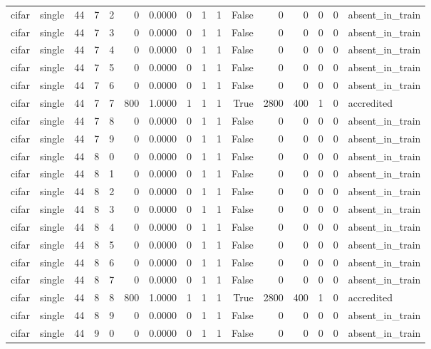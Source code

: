 \begin{tabular}{llrrrrrrrrrrrrrl}
cifar & single & 44 & 7 & 2 & 0 & 0.0000 & 0 & 1 & 1 & False & 0 & 0 & 0 & 0 & absent\_in\_train \\
cifar & single & 44 & 7 & 3 & 0 & 0.0000 & 0 & 1 & 1 & False & 0 & 0 & 0 & 0 & absent\_in\_train \\
cifar & single & 44 & 7 & 4 & 0 & 0.0000 & 0 & 1 & 1 & False & 0 & 0 & 0 & 0 & absent\_in\_train \\
cifar & single & 44 & 7 & 5 & 0 & 0.0000 & 0 & 1 & 1 & False & 0 & 0 & 0 & 0 & absent\_in\_train \\
cifar & single & 44 & 7 & 6 & 0 & 0.0000 & 0 & 1 & 1 & False & 0 & 0 & 0 & 0 & absent\_in\_train \\
cifar & single & 44 & 7 & 7 & 800 & 1.0000 & 1 & 1 & 1 & True & 2800 & 400 & 1 & 0 & accredited \\
cifar & single & 44 & 7 & 8 & 0 & 0.0000 & 0 & 1 & 1 & False & 0 & 0 & 0 & 0 & absent\_in\_train \\
cifar & single & 44 & 7 & 9 & 0 & 0.0000 & 0 & 1 & 1 & False & 0 & 0 & 0 & 0 & absent\_in\_train \\
cifar & single & 44 & 8 & 0 & 0 & 0.0000 & 0 & 1 & 1 & False & 0 & 0 & 0 & 0 & absent\_in\_train \\
cifar & single & 44 & 8 & 1 & 0 & 0.0000 & 0 & 1 & 1 & False & 0 & 0 & 0 & 0 & absent\_in\_train \\
cifar & single & 44 & 8 & 2 & 0 & 0.0000 & 0 & 1 & 1 & False & 0 & 0 & 0 & 0 & absent\_in\_train \\
cifar & single & 44 & 8 & 3 & 0 & 0.0000 & 0 & 1 & 1 & False & 0 & 0 & 0 & 0 & absent\_in\_train \\
cifar & single & 44 & 8 & 4 & 0 & 0.0000 & 0 & 1 & 1 & False & 0 & 0 & 0 & 0 & absent\_in\_train \\
cifar & single & 44 & 8 & 5 & 0 & 0.0000 & 0 & 1 & 1 & False & 0 & 0 & 0 & 0 & absent\_in\_train \\
cifar & single & 44 & 8 & 6 & 0 & 0.0000 & 0 & 1 & 1 & False & 0 & 0 & 0 & 0 & absent\_in\_train \\
cifar & single & 44 & 8 & 7 & 0 & 0.0000 & 0 & 1 & 1 & False & 0 & 0 & 0 & 0 & absent\_in\_train \\
cifar & single & 44 & 8 & 8 & 800 & 1.0000 & 1 & 1 & 1 & True & 2800 & 400 & 1 & 0 & accredited \\
cifar & single & 44 & 8 & 9 & 0 & 0.0000 & 0 & 1 & 1 & False & 0 & 0 & 0 & 0 & absent\_in\_train \\
cifar & single & 44 & 9 & 0 & 0 & 0.0000 & 0 & 1 & 1 & False & 0 & 0 & 0 & 0 & absent\_in\_train \\

\end{tabular}
